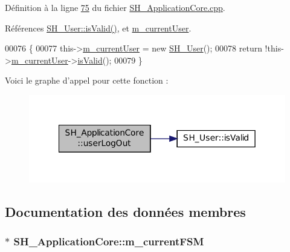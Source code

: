 Définition à la ligne \hyperlink{SH__ApplicationCore_8cpp_source_l00075}{75} du fichier \hyperlink{SH__ApplicationCore_8cpp_source}{S\-H\-\_\-\-Application\-Core.\-cpp}.



Références \hyperlink{classSH__User_aa1b7fd66632c13905f3b6fd941505c02}{S\-H\-\_\-\-User\-::is\-Valid()}, et \hyperlink{classSH__ApplicationCore_aa61720acee7e06e9828c570e8190304a}{m\-\_\-current\-User}.


\begin{DoxyCode}
00076 \{
00077     this->\hyperlink{classSH__ApplicationCore_aa61720acee7e06e9828c570e8190304a}{m\_currentUser} = \textcolor{keyword}{new} \hyperlink{classSH__User}{SH\_User}();
00078     \textcolor{keywordflow}{return} !this->\hyperlink{classSH__ApplicationCore_aa61720acee7e06e9828c570e8190304a}{m\_currentUser}->\hyperlink{classSH__User_aa1b7fd66632c13905f3b6fd941505c02}{isValid}();
00079 \}
\end{DoxyCode}


Voici le graphe d'appel pour cette fonction \-:
\nopagebreak
\begin{figure}[H]
\begin{center}
\leavevmode
\includegraphics[width=342pt]{classSH__ApplicationCore_abe6683bdada7ecf979b74656748be106_cgraph}
\end{center}
\end{figure}




\subsection{Documentation des données membres}
\hypertarget{classSH__ApplicationCore_a1088f3ba13abb8b3989cc0c325524232}{
\subsubsection[{m\-\_\-current\-F\-S\-M}]{$\ast$ S\-H\-\_\-\-Application\-Core\-::m\-\_\-current\-F\-S\-M\hspace{0.3cm}{\ttfamily [private]}}}\label{classSH__ApplicationCore_a1088f3ba13abb8b3989cc0c325524232}


